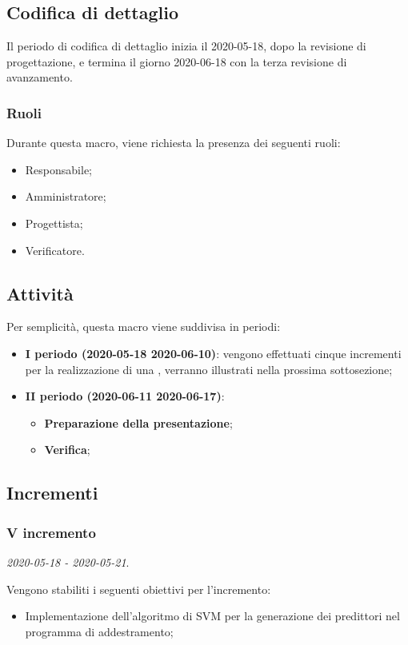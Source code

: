 \documentclass[../piano-di-progetto.tex]{subfiles}
\begin{document}
\subsection{Codifica di dettaglio}
Il periodo di codifica di dettaglio inizia il 2020-05-18, dopo la revisione di progettazione, e termina il giorno 2020-06-18 con la terza revisione di avanzamento.
\subsubsection{Ruoli}
Durante questa macro, viene richiesta la presenza dei seguenti ruoli:
\begin{itemize}
    \item Responsabile;
    \item Amministratore;
    \item Progettista;
    \item Verificatore.
\end{itemize}

\subsection{Attività}
Per semplicità, questa macro viene suddivisa in periodi:

\begin{itemize}
    \item \textbf{I periodo (2020-05-18 2020-06-10)}: vengono effettuati cinque incrementi per la realizzazione di una , verranno illustrati nella prossima sottosezione;
    \item \textbf{II periodo (2020-06-11 2020-06-17)}:
        \begin{itemize}
            \item \textbf{Preparazione della presentazione};
            \item \textbf{Verifica};
        \end{itemize}
\end{itemize}
\subsection{Incrementi}

\subsubsection{V incremento}
\emph{2020-05-18 - 2020-05-21}. 
 
 Vengono stabiliti i seguenti obiettivi per l'incremento:
 \begin{itemize}
     \item Implementazione dell'algoritmo di SVM per la generazione dei predittori nel programma di addestramento;
 \end{itemize}
\end{document}
